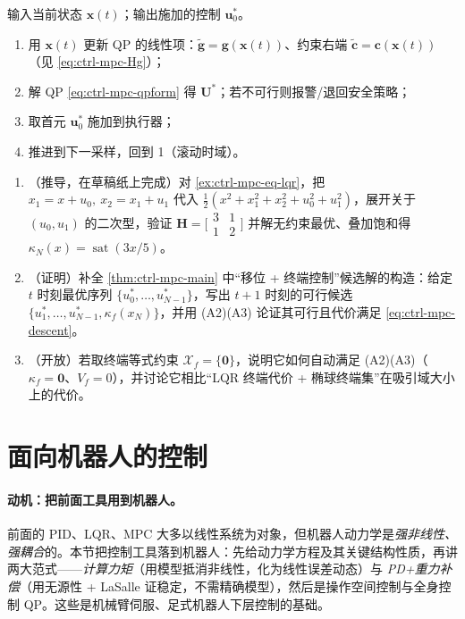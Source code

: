 \begin{algo}
\label{alg:ctrl-mpc}
输入当前状态 $\mathbf{x}(t)$；输出施加的控制 $\mathbf{u}_0^*$。
\begin{enumerate}
  \item 用 $\mathbf{x}(t)$ 更新 QP 的线性项：$\tilde{\mathbf{g}}=\mathbf{g}(\mathbf{x}(t))$、约束右端 $\tilde{\mathbf{c}}=\mathbf{c}(\mathbf{x}(t))$（见 \cref{eq:ctrl-mpc-Hg}）；
  \item 解 QP \cref{eq:ctrl-mpc-qpform} 得 $\mathbf{U}^*$；若不可行则报警/退回安全策略；
  \item 取首元 $\mathbf{u}_0^*$ 施加到执行器；
  \item 推进到下一采样，回到 1（滚动时域）。
\end{enumerate}
\end{algo}

\begin{practice}
\begin{enumerate}
  \item （推导，在草稿纸上完成）对 \cref{ex:ctrl-mpc-eq-lqr}，把 $x_1=x+u_0,\ x_2=x_1+u_1$ 代入 $\tfrac12(x^2+x_1^2+x_2^2+u_0^2+u_1^2)$，展开关于 $(u_0,u_1)$ 的二次型，验证 $\mathbf{H}=\big[\begin{smallmatrix}3&1\\1&2\end{smallmatrix}\big]$ 并解无约束最优、叠加饱和得 $\kappa_N(x)=\operatorname{sat}(3x/5)$。
  \item （证明）补全 \cref{thm:ctrl-mpc-main} 中“移位 + 终端控制”候选解的构造：给定 $t$ 时刻最优序列 $\{u_0^*,\dots,u_{N-1}^*\}$，写出 $t+1$ 时刻的可行候选 $\{u_1^*,\dots,u_{N-1}^*,\kappa_f(x_N)\}$，并用 (A2)(A3) 论证其可行且代价满足 \cref{eq:ctrl-mpc-descent}。
  \item （开放）若取终端等式约束 $\mathcal{X}_f=\{\mathbf{0}\}$，说明它如何自动满足 (A2)(A3)（$\kappa_f=\mathbf{0}$、$V_f=0$），并讨论它相比“LQR 终端代价 + 椭球终端集”在吸引域大小上的代价。
\end{enumerate}
\end{practice}

\section{面向机器人的控制}
\label{sec:ctrl-robot}

\paragraph{动机：把前面工具用到机器人。}
前面的 PID、LQR、MPC 大多以线性系统为对象，但机器人动力学是\emph{强非线性、强耦合}的。本节把控制工具落到机器人：先给动力学方程及其关键结构性质，再讲两大范式——\emph{计算力矩}（用模型抵消非线性，化为线性误差动态）与 \emph{PD+重力补偿}（用无源性 + LaSalle 证稳定，不需精确模型），然后是操作空间控制与全身控制 QP。这些是机械臂伺服、足式机器人下层控制的基础。

